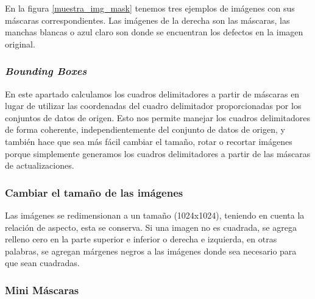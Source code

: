 
En la figura \ref{muestra_img_mask} tenemos tres ejemplos de imágenes con sus máscaras correspondientes. Las imágenes de la derecha son las máscaras, las manchas blancas o azul claro son donde se encuentran los defectos en la imagen original.

\subsubsection{\textit{Bounding Boxes}}

En este apartado calculamos los cuadros delimitadores a partir de máscaras en lugar de utilizar las coordenadas del cuadro delimitador proporcionadas por los conjuntos de datos de origen. Esto nos permite manejar los cuadros delimitadores de forma coherente, independientemente del conjunto de datos de origen, y también hace que sea más fácil cambiar el tamaño, rotar o recortar imágenes porque simplemente generamos los cuadros delimitadores a partir de las máscaras de actualizaciones.



\subsubsection{Cambiar el tamaño de las imágenes}

Las imágenes se redimensionan a un tamaño (1024x1024), teniendo en cuenta la relación de aspecto, esta se conserva. Si una imagen no es cuadrada, se agrega relleno cero en la parte superior e inferior o derecha e izquierda, en otras palabras, se agregan márgenes negros a las imágenes donde sea necesario para que sean cuadradas.



\subsubsection{Mini Máscaras}

